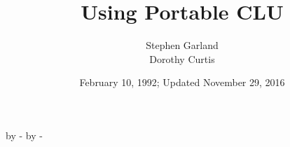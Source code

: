 
\topmargin 0pt
\advance \topmargin by -\headheight
\advance \topmargin by -\headsep
\textheight 8.9in
\oddsidemargin 0pt
\evensidemargin \oddsidemargin
\marginparwidth 0.5in
\textwidth 6.5in

\newenvironment{indenttext}{%
\begin{list}{}{%
\leftmargin=0.5in%
\rightmargin=0in%
\labelsep=0pt%
\labelwidth=0pt%
\listparindent=\parindent%
}%
\item%
}{%
\end{list}%
}

\newenvironment{syntax}{%
\subsection*{\hspace{0.25in}Syntax}%
\begin{indenttext}
}{%
\end{indenttext}%
}

\newenvironment{overview}{%
\subsection*{\hspace{0.25in}Overview}%
\begin{indenttext}
}{%
\end{indenttext}%
}

\newenvironment{options}{%
\subsection*{\hspace{0.25in}Options}%
\begin{indenttext}
\begin{tabular}{@{\hspace{\tabcolsep}\tt}lp{4.4in}}%
}{%
\end{tabular}%
\end{indenttext}%
}

\newenvironment{comments}{%
\subsection*{\hspace{0.25in}Comments}%
\begin{indenttext}
}{%
\end{indenttext}%
}

\title{Using Portable CLU}
\date{February 10, 1992; Updated November 29, 2016}
\author{Stephen Garland\\Dorothy Curtis}




